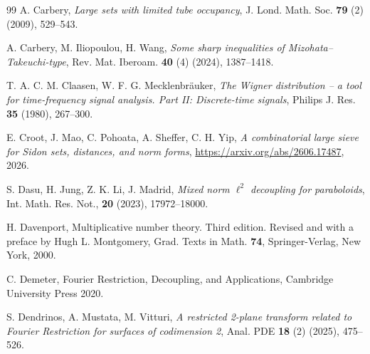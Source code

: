 \documentclass[11pt,reqno]{amsart}
\numberwithin{equation}{section}
\begin{document}
\begin{thebibliography}{99}
 A. Carbery, \textit{Large sets with limited tube occupancy}, J. Lond. Math. Soc. \textbf{79} (2) (2009), 529--543.

 A. Carbery, M. Iliopoulou, H. Wang, \textit{Some sharp inequalities of Mizohata--Takeuchi-type}, Rev. Mat. Iberoam. \textbf{40} (4) (2024), 1387--1418.




 T. A. C. M. Claasen, W. F. G. Mecklenbr\"auker, \textit{The Wigner distribution -- a tool for time-frequency signal analysis. Part II: Discrete-time signals}, Philips J. Res. \textbf{35} (1980), 267--300.



 E. Croot, J. Mao, C. Pohoata, A. Sheffer, C. H. Yip, \textit{A combinatorial large sieve for Sidon sets, distances, and norm forms}, \url{https://arxiv.org/abs/2606.17487}, 2026.

 S. Dasu, H. Jung, Z. K. Li, J. Madrid, \textit{Mixed norm $\ell^2$ decoupling for paraboloids}, Int. Math. Res. Not., \textbf{20} (2023), 17972--18000. 

 H. Davenport, Multiplicative number theory. Third edition. Revised and with a preface by Hugh L. Montgomery, Grad. Texts in Math. \textbf{74}, Springer-Verlag, New York, 2000.

 C. Demeter, Fourier Restriction, Decoupling, and Applications, Cambridge University Press 2020.

 S. Dendrinos, A. Mustata, M. Vitturi, \textit{A restricted 2-plane transform related to Fourier Restriction for surfaces of codimension 2}, Anal. PDE \textbf{18} (2) (2025), 475--526.


\end{thebibliography}
\end{document}
